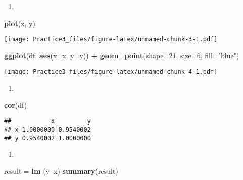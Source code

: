 \documentclass[
]{article}
\newenvironment{Shaded}{\begin{snugshade}}{\end{snugshade}}
\newcommand{\DataTypeTok}[1]{\textcolor[rgb]{0.13,0.29,0.53}{#1}}
\newcommand{\DecValTok}[1]{\textcolor[rgb]{0.00,0.00,0.81}{#1}}
\newcommand{\KeywordTok}[1]{\textcolor[rgb]{0.13,0.29,0.53}{\textbf{#1}}}
\newcommand{\NormalTok}[1]{#1}
\newcommand{\OperatorTok}[1]{\textcolor[rgb]{0.81,0.36,0.00}{\textbf{#1}}}
\newcommand{\StringTok}[1]{\textcolor[rgb]{0.31,0.60,0.02}{#1}}
\begin{document}
\begin{enumerate}
\def\labelenumi{(\alph{enumi})}
\item
\end{enumerate}

\begin{Shaded}
\begin{Highlighting}[]
\KeywordTok{plot}\NormalTok{(x, y)}
\end{Highlighting}
\end{Shaded}

\texttt{[image: Practice3\_files/figure-latex/unnamed-chunk-3-1.pdf]}

\begin{Shaded}
\begin{Highlighting}[]
\KeywordTok{ggplot}\NormalTok{(df, }\KeywordTok{aes}\NormalTok{(}\DataTypeTok{x=}\NormalTok{x, }\DataTypeTok{y=}\NormalTok{y)) }\OperatorTok{+}\StringTok{ }\KeywordTok{geom_point}\NormalTok{(}\DataTypeTok{shape=}\DecValTok{21}\NormalTok{, }\DataTypeTok{size=}\DecValTok{6}\NormalTok{, }\DataTypeTok{fill=}\StringTok{"blue"}\NormalTok{)}
\end{Highlighting}
\end{Shaded}

\texttt{[image: Practice3\_files/figure-latex/unnamed-chunk-4-1.pdf]}

\begin{enumerate}
\def\labelenumi{(\alph{enumi})}
\setcounter{enumi}{1}
\item
\end{enumerate}

\begin{Shaded}
\begin{Highlighting}[]
\KeywordTok{cor}\NormalTok{(df)}
\end{Highlighting}
\end{Shaded}

\begin{verbatim}
##           x         y
## x 1.0000000 0.9540002
## y 0.9540002 1.0000000
\end{verbatim}

\begin{enumerate}
\def\labelenumi{(\alph{enumi})}
\setcounter{enumi}{2}
\item
\end{enumerate}

\begin{Shaded}
\begin{Highlighting}[]
\NormalTok{result =}\StringTok{ }\KeywordTok{lm}\NormalTok{ (y}\OperatorTok{~}\NormalTok{x)}
\KeywordTok{summary}\NormalTok{(result)}
\end{Highlighting}
\end{Shaded}
\end{document}
